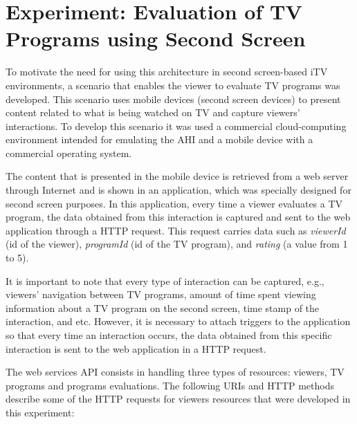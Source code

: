 \documentclass[journal]{IEEEtran}
\begin{document}
\section{Experiment: Evaluation of TV Programs using Second Screen}
\label{sec_experiment}


To motivate the need for using this architecture in second screen-based iTV environments, a scenario that enables the viewer to evaluate TV programs was developed. This scenario uses mobile devices (second screen devices) to present content related to what is being watched on TV and capture viewers' interactions. To develop this scenario it was used a commercial cloud-computing environment intended for emulating the AHI and a mobile device with a commercial operating system.

The content that is presented in the mobile device is retrieved from a web server through Internet and is shown in an application, which was specially designed for second screen purposes. In this application, every time a viewer evaluates a TV program, the data obtained from this interaction is captured and sent to the web application through a HTTP request. This request carries data such as \emph{viewerId} (id of the viewer), \emph{programId} (id of the TV program), and \emph{rating} (a value from 1 to 5).

It is important to note that every type of interaction can be captured, e.g., viewers' navigation between TV programs, amount of time spent viewing information about a TV program on the second screen, time stamp of the interaction, and etc. However, it is necessary to attach triggers to the application so that every time an interaction occurs, the data obtained from this specific interaction is sent to the web application in a HTTP request.


The web services API consists in handling three types of resources: viewers, TV programs and programs evaluations. The following URIs and HTTP methods describe some of the HTTP requests for viewers resources that were developed in this experiment:
\end{document}
